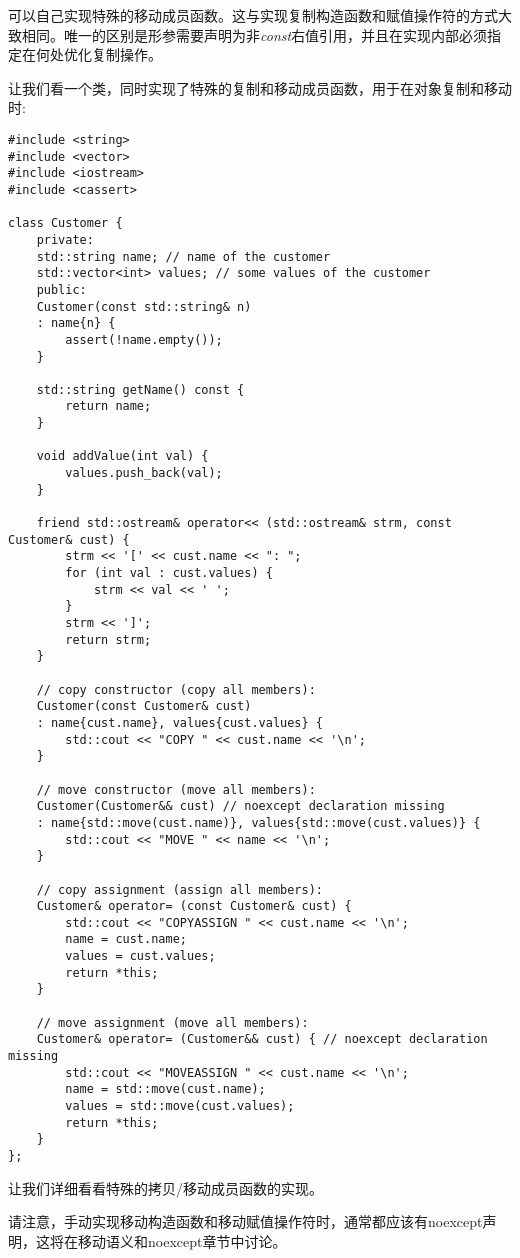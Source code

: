 可以自己实现特殊的移动成员函数。这与实现复制构造函数和赋值操作符的方式大致相同。唯一的区别是形参需要声明为非\textit{const}右值引用，并且在实现内部必须指定在何处优化复制操作。\par

让我们看一个类，同时实现了特殊的复制和移动成员函数，用于在对象复制和移动时:\par

{\color{red}{basics/customerimpl.hpp}}

\begin{lstlisting}[caption={}]
#include <string>
#include <vector>
#include <iostream>
#include <cassert>

class Customer {
	private:
	std::string name; // name of the customer
	std::vector<int> values; // some values of the customer
	public:
	Customer(const std::string& n)
	: name{n} {
		assert(!name.empty());
	}

	std::string getName() const {
		return name;
	}

	void addValue(int val) {
		values.push_back(val);
	}

	friend std::ostream& operator<< (std::ostream& strm, const Customer& cust) {
		strm << '[' << cust.name << ": ";
		for (int val : cust.values) {
			strm << val << ' ';
		}
		strm << ']';
		return strm;
	}

	// copy constructor (copy all members):
	Customer(const Customer& cust)
	: name{cust.name}, values{cust.values} {
		std::cout << "COPY " << cust.name << '\n';
	}

	// move constructor (move all members):
	Customer(Customer&& cust) // noexcept declaration missing
	: name{std::move(cust.name)}, values{std::move(cust.values)} {
		std::cout << "MOVE " << name << '\n';
	}

	// copy assignment (assign all members):
	Customer& operator= (const Customer& cust) {
		std::cout << "COPYASSIGN " << cust.name << '\n';
		name = cust.name;
		values = cust.values;
		return *this;
	}

	// move assignment (move all members):
	Customer& operator= (Customer&& cust) { // noexcept declaration missing
		std::cout << "MOVEASSIGN " << cust.name << '\n';
		name = std::move(cust.name);
		values = std::move(cust.values);
		return *this;
	}
};
\end{lstlisting}

让我们详细看看特殊的拷贝/移动成员函数的实现。\par

请注意，手动实现移动构造函数和移动赋值操作符时，通常都应该有noexcept声明，这将在移动语义和noexcept章节中讨论。\par

